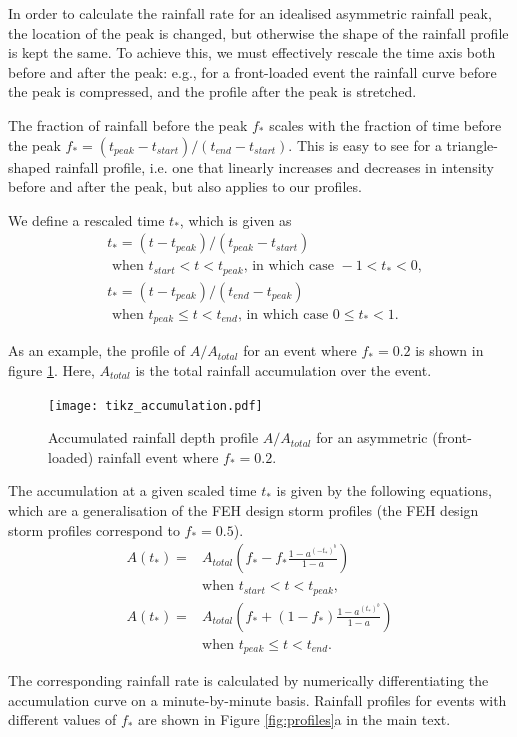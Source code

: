 \documentclass[APA,Times2COL]{WileyNJDv5}
\begin{document}
In order to calculate the rainfall rate for an idealised asymmetric rainfall peak, the location of the peak is changed, but otherwise the shape of the rainfall profile is kept the same. To achieve this, we must effectively rescale the time axis both before and after the peak: e.g., for a front-loaded event the rainfall curve before the peak is compressed, and the profile after the peak is stretched. 

The fraction of rainfall before the peak $f_*$ scales with the fraction of time before the peak $f_* = (t_{peak}-t_{start})/(t_{end}-t_{start})$. This is easy to see for a triangle-shaped rainfall profile, i.e. one that linearly increases and decreases in intensity before and after the peak, but also applies to our profiles.

We define a rescaled time $t_*$, which is given as
\begin{align*}
&t_*=(t-t_{peak})/(t_{peak}-t_{start}) \\ & \textrm{ when } t_{start} <t<t_{peak} \textrm{, in which case } -1<t_*<0, \\
&t_*=(t-t_{peak})/(t_{end}-t_{peak}) \\ & \textrm{ when } t_{peak} \leq t<t_{end} \textrm{, in which case } 0 \leq t_*<1. 
\end{align*}

As an example, the profile of $A/A_{total}$ for an event where $f_*=0.2$ is shown in figure \ref{fig:accprof}. Here, $A_{total}$ is the total rainfall accumulation over the event. 

\begin{figure}
\texttt{[image: tikz\_accumulation.pdf]}
\caption{Accumulated rainfall depth profile $A/A_{total}$ for an asymmetric (front-loaded) rainfall event where $f_*=0.2$.}
\label{fig:accprof}
\end{figure}

The accumulation at a given scaled time $t_*$ is given by the following equations, which are a generalisation of the FEH design storm profiles (the FEH design storm profiles correspond to $f_*=0.5$). 
\begin{align*}
A(t_*) = & A_{total}\left(f_*-f_* \frac{1-a^{(-t_*)^b}}{1-a} \right) \\ & \textrm{when } t_{start}<t<t_{peak}, \\
A(t_*) = & A_{total}\left(f_*+(1-f_*) \frac{1-a^{(t_*)^b}}{1-a} \right) \\\ & \textrm{when } t_{peak} \leq t<t_{end}.  
\end{align*}

The corresponding rainfall rate is calculated by numerically differentiating the accumulation curve on a minute-by-minute basis. Rainfall profiles for events with different values of $f_*$ are shown in Figure \ref{fig:profiles}a in the main text.

\newpage
\clearpage

\end{document}
